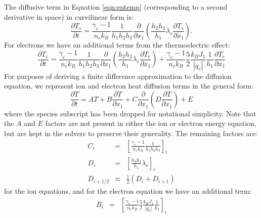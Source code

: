 \documentclass[11pt,letterpaper]{article}
\begin{document}
The diffusive term in Equation \ref{eqn:entemp} (corresponding to a second derivative in space) in curvilinear form is:
\begin{equation}
\frac{\partial T_s}{\partial t}  = \frac{\gamma_s - 1}{n_s k_B} \frac{1}{h_1 h_2 h_3} \frac{\partial}{\partial x_1} \left( \frac{h_2 h_3}{h_1} \lambda_s \frac{\partial T_s}{\partial x_1} \right).
\end{equation}
For electrons we have an additional terms from the thermoelectric effect:
\begin{equation}
\frac{\partial T_e}{\partial t} = \frac{\gamma_e - 1}{n_e k_B} \frac{1}{h_1 h_2 h_3} \frac{\partial}{\partial x_1} \left( \frac{h_2 h_3}{h_1} \lambda_e \frac{\partial T_e}{\partial x_1} \right) + \frac{\gamma_e - 1}{n_e k_B} \frac{5}{2} \frac{k_B J_1}{|q_e|} \frac{1}{h_1} \frac{\partial T_e}{\partial x_1}
\end{equation}
For purposes of deriving a finite difference approximation to the diffusion equation, we represent ion and electron heat diffusion terms in the general form:
\begin{equation}
\frac{\partial T}{\partial t} =  A T  + B \frac{\partial T}{\partial x_1} + C \frac{\partial}{\partial x_1} \left( D \frac{\partial T}{\partial x_1} \right) + E \label{eqn:generaldiff}
\end{equation}
where the species subscript has been dropped for notational simplicity.  Note that the $A$ and $E$ factors are not present in either the ion or electron energy equation, but are kept in the solvers to preserve their generality.  The remaining factors are:
\begin{eqnarray}
C_i &=& \left[ \frac{\gamma_s - 1}{n_s k_B} \frac{1}{h_1 h_2 h_3} \right]_i \nonumber \\ 
D_i &=& \left[ \frac{h_2 h_3}{h_1} \lambda_s \right]_i \nonumber \\ 
D_{i+1/2} &\approx& \frac{1}{2} \left( D_i + D_{i+1} \right) \nonumber
\end{eqnarray}
for the ion equations, and for the electron equation we have an additional term:
\begin{eqnarray}
B_i &=& \left[ \frac{\gamma_e - 1}{n_e k_B} \frac{5}{2} \frac{k_B J_1}{|q_e|} \frac{1}{h_1} \right]_i \nonumber 
\end{eqnarray}
\end{document}
